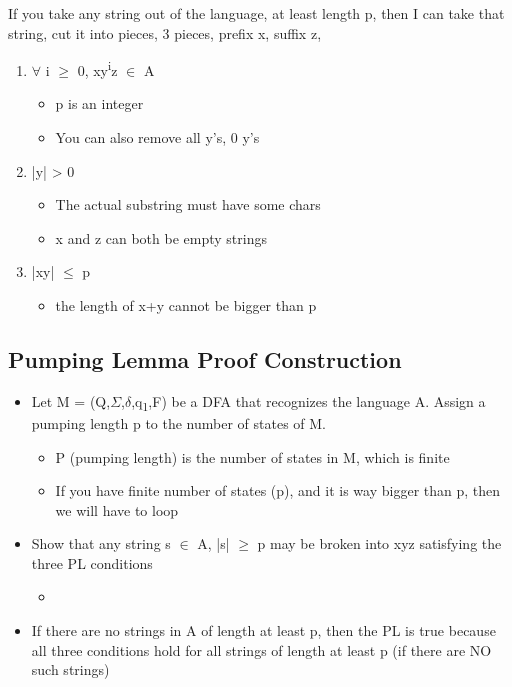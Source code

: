 \documentclass[11pt]{article}
\begin{document}
If you take any string out of the language, at least length p, then I can take that string, cut it into pieces, 3 pieces, prefix x, suffix z,\\

\begin{enumerate}
\item \(\forall\) i \(\ge\) 0, xy\textsuperscript{i}z \(\in\) A\\
\begin{itemize}
\item p is an integer\\
\item You can also remove all y's, 0 y's\\
\end{itemize}
\item |y| > 0\\
\begin{itemize}
\item The actual substring must have some chars\\
\item x and z can both be empty strings\\
\end{itemize}
\item |xy| \(\le\) p\\
\begin{itemize}
\item the length of x+y cannot be bigger than p\\
\end{itemize}
\end{enumerate}
\subsection{Pumping Lemma Proof Construction}
\label{sec:org0169d8a}
\begin{itemize}
\item Let M = (Q,\(\Sigma\),\(\delta\),q\textsubscript{1},F) be a DFA that recognizes the language A. Assign a pumping length p to the number of states of M.\\
\begin{itemize}
\item P (pumping length) is the number of states in M, which is finite\\
\item If you have finite number of states (p), and it is way bigger than p, then we will have to loop\\
\end{itemize}
\item Show that any string s \(\in\) A, |s| \(\ge\) p may be broken into xyz satisfying the three PL conditions\\
\begin{itemize}
\item 
\end{itemize}
\item If there are no strings in A of length at least p, then the PL is true because all three conditions hold for all strings of length at least p (if there are NO such strings)\\
\end{itemize}
\end{document}
